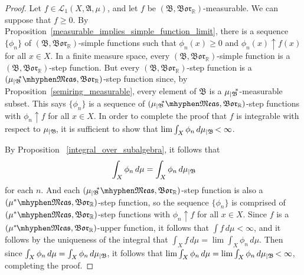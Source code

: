 \documentclass[
twoside=true,
paper=letter,
fontsize=9pt,
pagesize=auto,
leqno,
openany,
headsepline,
overfullrule,
]{scrbook}
\theoremstyle{plain}
\theoremstyle{plain}
\theoremstyle{definition}
\theoremstyle{bfnoteitalic}
\theoremstyle{bfnoteroman}
\newcommand{\sigalg}[1]{\mathfrak{#1}}
\newcommand{\cali}[1]{\mathscr{#1}}
\newcommand{\borel}{\mathfrak{Bor}}
\newcommand{\restrictedto}[1]{_{\lvert#1}\kern-1.5pt}
\newcommand{\R}{\mathbb{R}}
\newcommand{\sigmaalgebra}{\sigalg{A}}
\newcommand{\sigmaalgebraii}{\sigalg{B}}
\newcommand{\measurable}[1]{{#1}\mhyphen\mathfrak{Meas}}
\newcommand{\kernast}{\ast\kern-1pt}
\newcommand{\measuresubstar}[1]{\measure\restrictedto{#1}\kern-2pt^*}
\newcommand{\measurespace}{X}
\newcommand{\measure}{\mu}
\begin{document}
\begin{proof}
Let $f\in\cali{L}_1(\measurespace, \sigmaalgebra, \measure)$, and let $f$ be 
$(\sigmaalgebraii, \borel_\R)$\hyp{}measurable. We can suppose that $f\geq 0$.  By Proposition~\ref{measurable_implies_simple_function_limit}, there is a sequence $\{\phi_n\}$ of $(\sigmaalgebraii, \borel_\R)$-simple functions such that 
$\phi_n(x)\geq 0$ and $\phi_n(x)\uparrow f(x)$ for all $x\in\measurespace$.
In a finite measure space, every $(\sigmaalgebraii, \borel_\R)$-simple function is a $(\sigmaalgebraii, \borel_\R)$-step function.
But every $(\sigmaalgebraii, \borel_\R)$-step function is a 
$(\measurable{\measuresubstar{\sigmaalgebraii}},\borel_\R)$-step function since, 
by Proposition~\ref{semiring_measurable}, every element of $\sigmaalgebraii$ is a $\measuresubstar{\sigmaalgebraii}$-measurable subset. 
This says $\{\phi_n\}$ is a sequence of $(\measurable{\measuresubstar{\sigmaalgebraii}},\borel_\R)$-step functions with $\phi_n\uparrow f$ for all $x\in\measurespace$. In order to complete the proof that $f$ is integrable with respect to $\measure\restrictedto{\sigmaalgebraii}$, it is sufficient to show that 
$\lim \int_\measurespace \phi_n \, d \measure\restrictedto{\sigmaalgebraii} < \infty$.

By Proposition ~\ref{integral_over_subalgebra}, it follows that
\[
\int_\measurespace \phi_n \, d\measure
= \int_\measurespace \phi_n \, d\measure\restrictedto{\sigmaalgebraii}
\]
for each $n$.
And each $(\measurable{\measuresubstar{\sigmaalgebraii}},\borel_\R)$-step function is also a $(\measurable{\measure^*},\borel_\R)$-step function, so the sequence
$\{\phi_n\}$ is comprised of $(\measurable{\measure^*},\borel_\R)$-step functions with $\phi_n\uparrow f$ for all $x\in\measurespace$.
Since $f$ is a $(\measurable{\measure^\kernast}, \borel_\R)$-upper function, 
it follows that $\int f\,d\measure<\infty$, and it follows by the uniqueness of the integral that 
$\int_\measurespace f \, d\measure
=
\lim\int_\measurespace \phi_n \, d\measure$.
Then since 
$\int_\measurespace \phi_n \, d\measure
= 
\int_\measurespace \phi_n \, d\measure\restrictedto{\sigmaalgebraii}$,
it follows that 
$\lim\int_\measurespace \phi_n \, d\measure
= 
\lim\int_\measurespace \phi_n \, d\measure\restrictedto{\sigmaalgebraii}<\infty$, completing the proof.
\end{proof}
\end{document}
